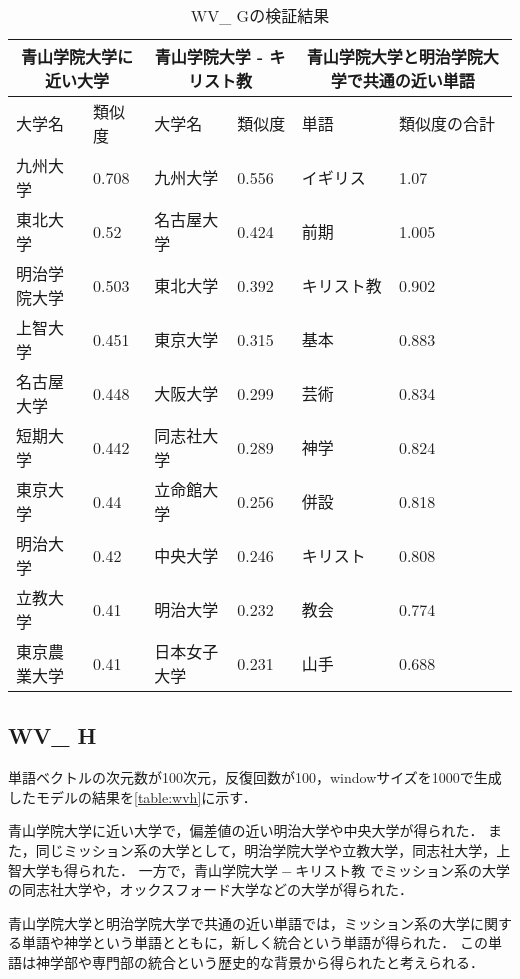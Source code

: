 \begin{table}[H]
\caption{WV\_ Gの検証結果}
\centering
\footnotesize
\begin{tabular}{ll|ll|ll}
\hline
\multicolumn{2}{c}{青山学院大学に近い大学} & \multicolumn{2}{c}{青山学院大学 - キリスト教} & \multicolumn{2}{c}{青山学院大学と明治学院大学で共通の近い単語}
\\ \hline
大学名 & 類似度 & 大学名 & 類似度 & 単語 & 類似度の合計
\\ \hline \hline
九州大学 & 0.708 & 九州大学 & 0.556 & イギリス & 1.07\\
東北大学 & 0.52 & 名古屋大学 & 0.424 & 前期 & 1.005\\
明治学院大学 & 0.503 & 東北大学 & 0.392 & キリスト教 & 0.902\\
上智大学 & 0.451 & 東京大学 & 0.315 & 基本 & 0.883\\
名古屋大学 & 0.448 & 大阪大学 & 0.299 & 芸術 & 0.834\\
短期大学 & 0.442 & 同志社大学 & 0.289 & 神学 & 0.824\\
東京大学 & 0.44 & 立命館大学 & 0.256 & 併設 & 0.818\\
明治大学 & 0.42 & 中央大学 & 0.246 & キリスト & 0.808\\
立教大学 & 0.41 & 明治大学 & 0.232 & 教会 & 0.774\\
東京農業大学 & 0.41 & 日本女子大学 & 0.231 & 山手 & 0.688\\ \hline
\end{tabular}
\label{table:wvg}
\end{table}


\subsection{WV\_ H}
単語ベクトルの次元数が100次元，反復回数が100，windowサイズを1000で生成したモデルの結果を\ref{table:wvh}に示す．

青山学院大学に近い大学で，偏差値の近い明治大学や中央大学が得られた．
また，同じミッション系の大学として，明治学院大学や立教大学，同志社大学，上智大学も得られた．
一方で，$ 青山学院大学 - キリスト教 $ でミッション系の大学の同志社大学や，オックスフォード大学などの大学が得られた．

青山学院大学と明治学院大学で共通の近い単語では，ミッション系の大学に関する単語や神学という単語とともに，新しく統合という単語が得られた．
この単語は神学部や専門部の統合という歴史的な背景から得られたと考えられる．

